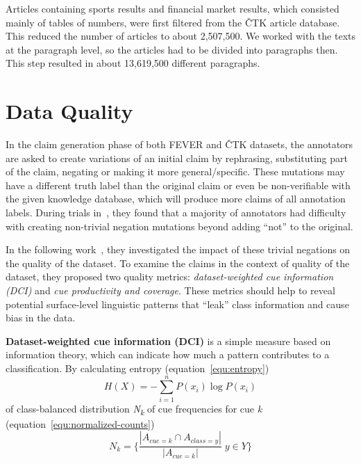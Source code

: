     Articles containing sports results and financial market results, which consisted mainly of tables of numbers, were first filtered from the ČTK article database. This reduced the number of articles to about 2,507,500. We worked with the texts at the paragraph level, so the articles had to be divided into paragraphs then. This step resulted in about 13,619,500 different paragraphs.

    


\section{Data Quality}
\label{section:claim-quality}
    In the claim generation phase of both FEVER and ČTK datasets, the annotators are asked to create variations of an initial claim by rephrasing, substituting part of the claim, negating or making it more general/specific. These mutations may have a different truth label than the original claim or even be non-verifiable with the given knowledge database, which will produce more claims of all annotation labels. During trials in~\parencite{thorne2018fever}, they found that a majority of annotators had difficulty with creating non-trivial negation mutations beyond adding \enquote{not} to the original.  
    
    In the following work~\parencite{derczynski-etal-2020-claim-quality}, they investigated the impact of these trivial negations on the quality of the dataset. To examine the claims in the context of quality of the dataset, they proposed two quality metrics: \emph{dataset-weighted cue information (DCI)} and \emph{cue productivity and coverage}. These metrics should help to reveal potential surface-level linguistic patterns that \enquote{leak} class information and cause bias in the data.
    
    \textbf{Dataset-weighted cue information (DCI)} is a simple measure based on information theory, which can indicate how much a pattern contributes to a classification. By calculating entropy (equation~\ref{equ:entropy})
    \begin{equation}
        \label{equ:entropy}
        H(X) = -\sum_{i=1}^{n} P(x_i) \log P(x_i)
    \end{equation} of class-balanced distribution \emph{N\textsubscript{k}} of cue frequencies for cue \emph{k} (equation~\ref{equ:normalized-counts})
    \begin{equation}
        \label{equ:normalized-counts}
        N_k = \{ \frac{| A_{cue=k} \cap A_{class=y} |}{| A_{cue=k} |} \; y \in Y\}
    \end{equation}
    
